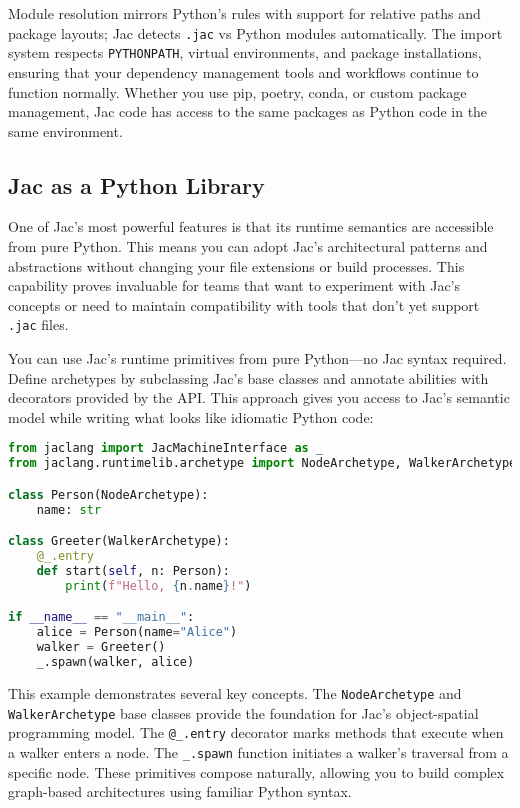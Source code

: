 Module resolution mirrors Python's rules with support for relative paths and package layouts; Jac detects \texttt{.jac} vs Python modules automatically. The import system respects \texttt{PYTHONPATH}, virtual environments, and package installations, ensuring that your dependency management tools and workflows continue to function normally. Whether you use pip, poetry, conda, or custom package management, Jac code has access to the same packages as Python code in the same environment.

\subsection{Jac as a Python Library}

One of Jac's most powerful features is that its runtime semantics are accessible from pure Python. This means you can adopt Jac's architectural patterns and abstractions without changing your file extensions or build processes. This capability proves invaluable for teams that want to experiment with Jac's concepts or need to maintain compatibility with tools that don't yet support \texttt{.jac} files.

You can use Jac's runtime primitives from pure Python—no Jac syntax required. Define archetypes by subclassing Jac's base classes and annotate abilities with decorators provided by the API. This approach gives you access to Jac's semantic model while writing what looks like idiomatic Python code:

\begin{lstlisting}[language=Python]
from jaclang import JacMachineInterface as _
from jaclang.runtimelib.archetype import NodeArchetype, WalkerArchetype

class Person(NodeArchetype):
    name: str

class Greeter(WalkerArchetype):
    @_.entry
    def start(self, n: Person):
        print(f"Hello, {n.name}!")

if __name__ == "__main__":
    alice = Person(name="Alice")
    walker = Greeter()
    _.spawn(walker, alice)
\end{lstlisting}

This example demonstrates several key concepts. The \texttt{NodeArchetype} and \texttt{WalkerArchetype} base classes provide the foundation for Jac's object-spatial programming model. The \texttt{@\_.entry} decorator marks methods that execute when a walker enters a node. The \texttt{\_.spawn} function initiates a walker's traversal from a specific node. These primitives compose naturally, allowing you to build complex graph-based architectures using familiar Python syntax.


